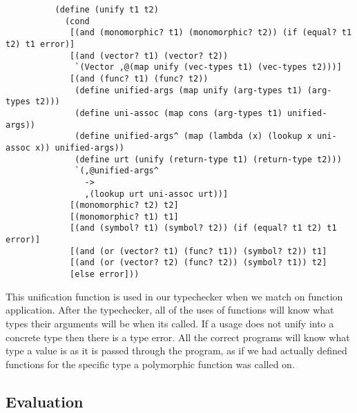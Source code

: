 \documentclass{article}
\begin{document}
\begin{scriptsize}
{\linespread{1}
\begin{verbatim}
          (define (unify t1 t2)
            (cond
             [(and (monomorphic? t1) (monomorphic? t2)) (if (equal? t1 t2) t1 error)]
             [(and (vector? t1) (vector? t2))
              `(Vector ,@(map unify (vec-types t1) (vec-types t2)))]
             [(and (func? t1) (func? t2))
              (define unified-args (map unify (arg-types t1) (arg-types t2)))
              (define uni-assoc (map cons (arg-types t1) unified-args))
              (define unified-args^ (map (lambda (x) (lookup x uni-assoc x)) unified-args))
              (define urt (unify (return-type t1) (return-type t2)))
              `(,@unified-args^
                ->
                ,(lookup urt uni-assoc urt))]
             [(monomorphic? t2) t2]
             [(monomorphic? t1) t1]
             [(and (symbol? t1) (symbol? t2)) (if (equal? t1 t2) t1 error)]
             [(and (or (vector? t1) (func? t1)) (symbol? t2)) t1]
             [(and (or (vector? t2) (func? t2)) (symbol? t1)) t2]
             [else error]))
\end{verbatim}
}
\end{scriptsize}

This unification function is used in our typechecker when we match on function
application. After the typechecker, all of the uses of functions will know what
types their arguments will be when its called. If a usage does not unify into a
concrete type then there is a type error. All the correct programs will know
what type a value is as it is passed through the program, as if we had actually
defined functions for the specific type a polymorphic function was called on.



\subsection*{Evaluation}
\end{document}
